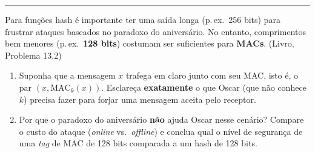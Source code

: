 \documentclass[11pt,a4paper]{article}
\newcommand{\livro}[1]{{\footnotesize\color{black!50}(Livro, Problema #1)}}
\newcommand{\exercicio}[1]{%
    \Needspace{8\baselineskip}%
    \par\vspace{1.2em}
    \noindent
    {\color{black!55}\rule[-0.25em]{3pt}{1.6em}}%
    \hspace{0.6em}{\Large\bfseries Exerc\'{i}cio #1}
    \par\vspace{-0.4em}
    \noindent{\color{black!35}\rule{\textwidth}{0.4pt}}
    \par\vspace{0.35em}
}
\begin{document}
\exercicio{2}
Para fun\c{c}\~{o}es hash \'{e} importante ter uma sa\'{i}da longa (p.\,ex.\ 256 bits) para frustrar ataques baseados no paradoxo do anivers\'{a}rio. No entanto, comprimentos bem menores (p.\,ex.\ \textbf{128 bits}) costumam ser suficientes para \textbf{MACs}. \livro{13.2}
\begin{enumerate}[label=(\alph*)]
    \item Suponha que a mensagem $x$ trafega em claro junto com seu MAC, isto \'{e}, o par $(x, \text{MAC}_k(x))$. Esclare\c{c}a \textbf{exatamente} o que Oscar (que n\~{a}o conhece $k$) precisa fazer para forjar uma mensagem aceita pelo receptor.
    \item Por que o paradoxo do anivers\'{a}rio \textbf{n\~{a}o} ajuda Oscar nesse cen\'{a}rio? Compare o custo do ataque (\emph{online} vs.\ \emph{offline}) e conclua qual o n\'{i}vel de seguran\c{c}a de uma \textit{tag} de MAC de 128 bits comparada a um hash de 128 bits.
\end{enumerate}
\end{document}

